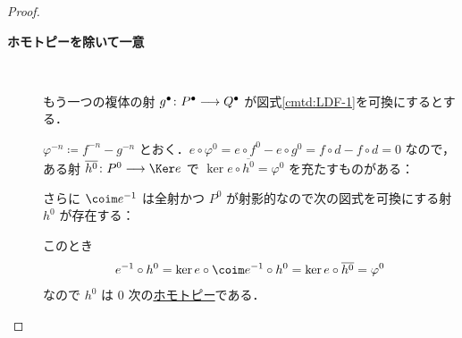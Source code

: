 \documentclass[algtopo_main]{subfiles}
\begin{document}
\begin{proof}
\begin{description}
    \item[\textbf{ホモトピーを除いて一意}]　
    
    もう一つの複体の射 $g^\bullet \colon P^\bullet \longrightarrow Q^\bullet$ が図式\ref{cmtd:LDF-1}を可換にするとする．
    
    $\varphi^{-n} \coloneqq f^{-n} - g^{-n}$ とおく．$e \circ \varphi^0 = e \circ f^0 - e \circ g^0 = f\circ d - f\circ d = 0$ なので，ある射 $\overline{h^0} \colon P^0 \lto \Ker e$ で $\ker e \circ \overline{h^0} = \varphi^0$ を充たすものがある：
    \begin{figure}[H]
        \centering
    \end{figure}%
    さらに $\coim e^{-1}$ は全射かつ $P^0$ が射影的なので次の図式を可換にする射 $h^0$ が存在する：
    \begin{figure}[H]
        \centering
    \end{figure}%
    このとき
    \begin{align}
        e^{-1} \circ h^0 = \ker e \circ \coim e^{-1} \circ h^0 = \ker e \circ \overline{h^0} = \varphi^0
    \end{align}
    なので $h^0$ は $0$ 次の\hyperref[def:chain-homotopy]{ホモトピー}である．



\end{description}
\end{proof}
\end{document}
